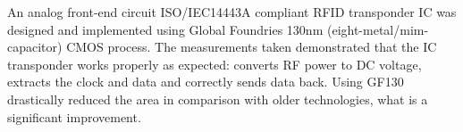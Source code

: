 An analog front-end circuit ISO/IEC14443A compliant RFID transponder IC was designed and implemented using Global Foundries 130nm (eight-metal/mim-capacitor) CMOS process. The measurements taken demonstrated that the IC transponder works properly as expected: converts RF power to DC voltage, extracts the clock and data and correctly sends data back. Using GF130 drastically reduced the area in comparison with older technologies, what is a significant improvement.
